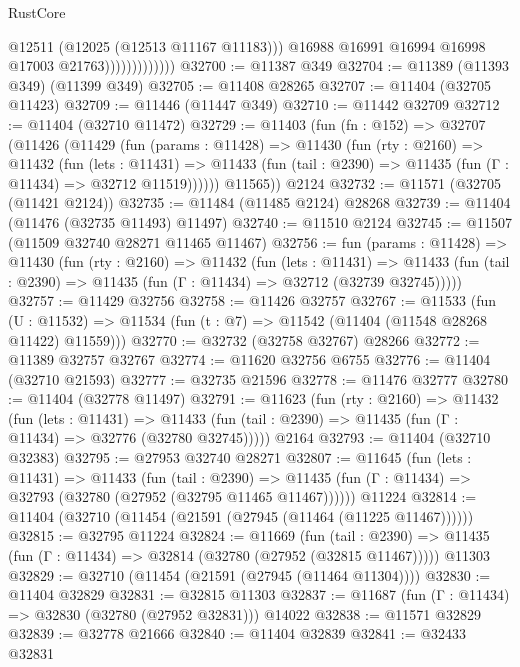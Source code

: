 \begin{lexlean}{RustCore}
\begin{coremodule}
                                @12511
                                (@12025 (@12513 @11167 @11183)))
                              @16988
                              @16991
                              @16994
                              @16998
                              @17003
                              @21763)))))))))))))
@32700 := @11387 @349
@32704 := @11389 (@11393 @349) (@11399 @349)
@32705 := @11408 @28265
@32707 := @11404 (@32705 @11423)
@32709 := @11446 (@11447 @349)
@32710 := @11442 @32709
@32712 := @11404 (@32710 @11472)
@32729 := @11403
    (fun (fn : @152) =>
    @32707
      (@11426
        (@11429
          (fun (params : @11428) =>
          @11430
            (fun (rty : @2160) =>
            @11432
              (fun (lets : @11431) =>
              @11433 (fun (tail : @2390) => @11435 (fun (Γ : @11434) => @32712 @11519))))))
        @11565))
    @2124
@32732 := @11571 (@32705 (@11421 @2124))
@32735 := @11484 (@11485 @2124) @28268
@32739 := @11404 (@11476 (@32735 @11493) @11497)
@32740 := @11510 @2124
@32745 := @11507 (@11509 @32740 @28271 @11465 @11467)
@32756 := fun (params : @11428) =>
  @11430
    (fun (rty : @2160) =>
    @11432
      (fun (lets : @11431) =>
      @11433 (fun (tail : @2390) => @11435 (fun (Γ : @11434) => @32712 (@32739 @32745)))))
@32757 := @11429 @32756
@32758 := @11426 @32757
@32767 := @11533
    (fun (U : @11532) => @11534 (fun (t : @7) => @11542 (@11404 (@11548 @28268 @11422) @11559)))
@32770 := @32732 (@32758 @32767) @28266
@32772 := @11389 @32757 @32767
@32774 := @11620 @32756 @6755
@32776 := @11404 (@32710 @21593)
@32777 := @32735 @21596
@32778 := @11476 @32777
@32780 := @11404 (@32778 @11497)
@32791 := @11623
    (fun (rty : @2160) =>
    @11432
      (fun (lets : @11431) =>
      @11433 (fun (tail : @2390) => @11435 (fun (Γ : @11434) => @32776 (@32780 @32745)))))
    @2164
@32793 := @11404 (@32710 @32383)
@32795 := @27953 @32740 @28271
@32807 := @11645
    (fun (lets : @11431) =>
    @11433
      (fun (tail : @2390) =>
      @11435 (fun (Γ : @11434) => @32793 (@32780 (@27952 (@32795 @11465 @11467))))))
    @11224
@32814 := @11404 (@32710 (@11454 (@21591 (@27945 (@11464 (@11225 @11467))))))
@32815 := @32795 @11224
@32824 := @11669
    (fun (tail : @2390) => @11435 (fun (Γ : @11434) => @32814 (@32780 (@27952 (@32815 @11467)))))
    @11303
@32829 := @32710 (@11454 (@21591 (@27945 (@11464 @11304))))
@32830 := @11404 @32829
@32831 := @32815 @11303
@32837 := @11687 (fun (Γ : @11434) => @32830 (@32780 (@27952 @32831))) @14022
@32838 := @11571 @32829
@32839 := @32778 @21666
@32840 := @11404 @32839
@32841 := @32433 @32831

\end{coremodule}
\end{lexlean}

